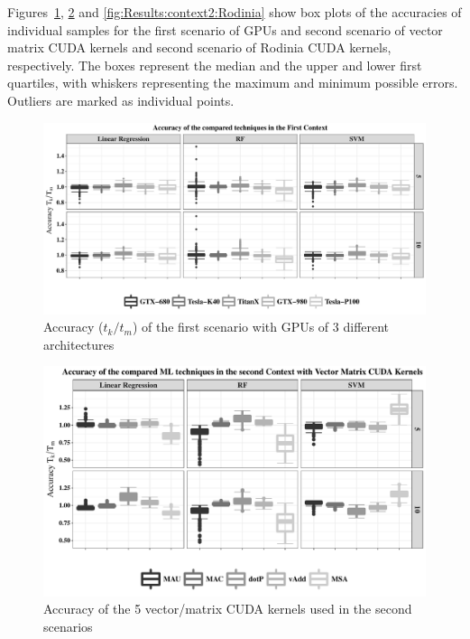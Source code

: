 Figures~\ref{fig:Results-contex1},  \ref{fig:Results:context2:NCA} and \ref{fig:Results:context2:Rodinia} show box plots of the accuracies of individual samples for the first scenario of GPUs and second scenario of vector matrix CUDA kernels and second scenario of Rodinia CUDA kernels, respectively. The boxes represent the median and the upper and lower first quartiles, with whiskers representing the maximum and minimum possible errors. Outliers are marked as individual points.

\begin{figure}[htpb]
    \centering
    \includegraphics[scale=.5]{images/ResultTechniques-Context1.pdf}
    \caption{Accuracy ($t_k/t_m$) of the first scenario with GPUs of 3 different architectures}
    \label{fig:Results-contex1}
\end{figure}

\begin{figure}[htpb]
    \centering
    \includegraphics[scale=.65]{images/ResultTechniques-Context2-NCA.pdf}
    \caption{Accuracy of the 5 vector/matrix CUDA kernels used in the second scenarios}
    \label{fig:Results:context2:NCA}
\end{figure}

